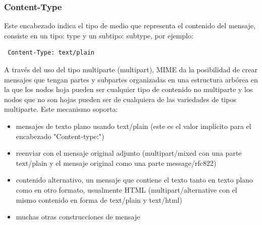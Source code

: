 \documentclass[a4paper]{report}
\begin{document}
\subsubsection*{Content-Type}
Este encabezado indica el tipo de medio que representa el contenido del mensaje,
consiste en un tipo: type y un subtipo: subtype, por ejemplo:
\begin{verbatim}
 Content-Type: text/plain
\end{verbatim}
A través del uso del tipo multiparte (multipart), MIME da la posibilidad de
crear mensajes que tengan partes y subpartes organizadas en una estructura
arbórea en la que los nodos hoja pueden ser cualquier tipo de contenido no
multiparte y los nodos que no son hojas pueden ser de cualquiera de las
variedades de tipos multiparte. Este mecanismo soporta:
\begin{itemize}
\item{mensajes de texto plano usando text/plain (este es el valor implícito para
el encabezado "Content-type:")}
\item{reenviar con el mensaje original adjunto (multipart/mixed con una parte
text/plain y el mensaje original como una parte message/rfc822)}
\item{contenido alternativo, un mensaje que contiene el texto tanto en texto
plano como en otro formato, usualmente HTML (multipart/alternative con el mismo
contenido en forma de text/plain y text/html)}
\item{muchas otras construcciones de mensaje}
\end{itemize}
\end{document}
